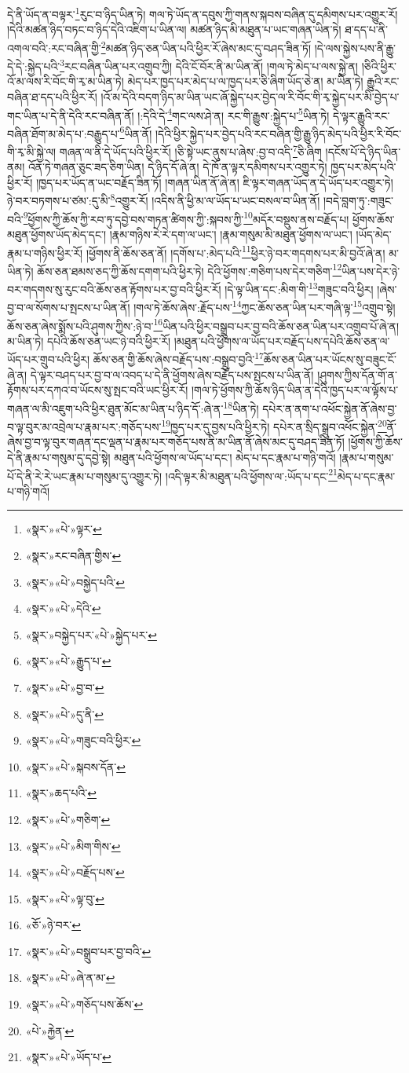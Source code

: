 དེ་ནི་ཡོད་ན་བལྟར་\footnote{«སྣར་»«པེ་»ལྟར་}རུང་བ་ཉིད་ཡིན་ཏེ། གལ་ཏེ་ཡོད་ན་དབུས་ཀྱི་གནས་སྐབས་བཞིན་དུ་དམིགས་པར་འགྱུར་རོ། །དེའི་མཚན་ཉིད་བཏང་བ་ཉིད་དེའི་འཇིག་པ་ཡིན་ལ། མཚན་ཉིད་མི་མཐུན་པ་ཡང་གཞན་ཡིན་ཏེ། ཐ་དད་པ་ནི་འགལ་བའི་:རང་བཞིན་གྱི་\footnote{«སྣར་»རང་བཞིན་གྱིས་}མཚན་ཉིད་ཅན་ཡིན་པའི་ཕྱིར་རོ་ཞེས་མང་དུ་བཤད་ཟིན་ཏོ། །དེ་ལས་སྐྱེས་པས་ནི་རྒྱུ་དེ་དེ་:སྐྱེད་པའི་\footnote{«སྣར་»«པེ་»བསྐྱེད་པའི་}རང་བཞིན་ཡིན་པར་འགྲུབ་ཀྱི། དེའི་ངོ་བོར་ནི་མ་ཡིན་ནོ། །གལ་ཏེ་མེད་པ་ལས་སྐྱེ་ན། །ཅིའི་ཕྱིར་འོ་མ་ལས་རི་བོང་གི་རྭ་མ་ཡིན་ཏེ། མེད་པར་ཁྱད་པར་མེད་པ་ལ་ཁྱད་པར་ཅི་ཞིག་ཡོད་ཅེ་ན། མ་ཡིན་ཏེ། རྒྱུའི་རང་བཞིན་ཐ་དད་པའི་ཕྱིར་རོ། །འོ་མ་དེའི་བདག་ཉིད་མ་ཡིན་ཡང་ཞོ་སྐྱེད་པར་བྱེད་ལ་རི་བོང་གི་རྭ་སྐྱེད་པར་མི་བྱེད་པ་གང་ཡིན་པ་དེ་ནི་དེའི་རང་བཞིན་ནོ། །:དེའི་དེ་\footnote{«སྣར་»«པེ་»དེའི་}གང་ལས་ཤེ་ན། རང་གི་རྒྱུས་:སྐྱེད་པ་\footnote{«སྣར་»བསྐྱེད་པར་«པེ་»སྐྱེད་པར་}ཡིན་ཏེ། དེ་ལྟར་རྒྱུའི་རང་བཞིན་ཐོག་མ་མེད་པ་:བརྒྱུད་པ་\footnote{«སྣར་»«པེ་»རྒྱུད་པ་}ཡིན་ནོ། །དེའི་ཕྱིར་སྐྱེད་པར་བྱེད་པའི་རང་བཞིན་གྱི་རྒྱུ་ཉིད་མེད་པའི་ཕྱིར་རི་བོང་གི་རྭ་མི་སྐྱེ་ལ། གཞན་ལ་ནི་དེ་ཡོད་པའི་ཕྱིར་རོ། །ཅི་སྟེ་ཡང་ནུས་པ་ཞེས་:བྱ་བ་འདི་\footnote{«སྣར་»«པེ་»བྱ་བ་}ཅི་ཞིག །དངོས་པོ་དེ་ཉིད་ཡིན་ནམ། འོན་ཏེ་གཞན་ཅུང་ཟད་ཅིག་ཡིན། དེ་ཉིད་དོ་ཞེ་ན། དེ་ཁོ་ན་ལྟར་དམིགས་པར་འགྱུར་ཏེ། ཁྱད་པར་མེད་པའི་ཕྱིར་རོ། །ཁྱད་པར་ཡོད་ན་ཡང་བརྗོད་ཟིན་ཏོ། །གཞན་ཡིན་ནོ་ཞེ་ན། ཇི་ལྟར་གཞན་ཡོད་ན་དེ་ཡོད་པར་འགྱུར་ཏེ། ཉེ་བར་བཏགས་པ་ཙམ་:དུ་མི་\footnote{«སྣར་»«པེ་»དུ་ནི་}འགྱུར་རོ། །འདིས་ནི་ཕྱི་མ་ལ་ཡོད་པ་ཡང་བསལ་བ་ཡིན་ནོ། །བདེ་བླག་ཏུ་:གཟུང་བའི་\footnote{«སྣར་»«པེ་»གཟུང་བའི་ཕྱིར་}ཕྱོགས་ཀྱི་ཆོས་ཀྱི་རབ་ཏུ་དབྱེ་བས་གཏན་ཚིགས་ཀྱི་:སྐབས་ཀྱི་\footnote{«སྣར་»«པེ་»སྐབས་དོན་}མདོར་བསྡུས་ནས་བརྗོད་པ། ཕྱོགས་ཆོས་མཐུན་ཕྱོགས་ཡོད་མེད་དང་། །རྣམ་གཉིས་རེ་རེ་དག་ལ་ཡང་། །རྣམ་གསུམ་མི་མཐུན་ཕྱོགས་ལ་ཡང་། །ཡོད་མེད་རྣམ་པ་གཉིས་ཕྱིར་རོ། །ཕྱོགས་ནི་ཆོས་ཅན་ནོ། །དགོས་པ་:མེད་པའི་\footnote{«སྣར་»ཆད་པའི་}ཕྱིར་ཉེ་བར་གདགས་པར་མི་བྱའོ་ཞེ་ན། མ་ཡིན་ཏེ། ཆོས་ཅན་ཐམས་ཅད་ཀྱི་ཆོས་དགག་པའི་ཕྱིར་ཏེ། དེའི་ཕྱོགས་:གཅིག་པས་དེར་གཅིག་\footnote{«སྣར་»«པེ་»གཅིག་}ཡིན་པས་དེར་ཉེ་བར་གདགས་སུ་རུང་བའི་ཆོས་ཅན་རྟོགས་པར་བྱ་བའི་ཕྱིར་རོ། །དེ་ལྟ་ཡིན་དང་:མིག་གི་\footnote{«སྣར་»«པེ་»མིག་གིས་}གཟུང་བའི་ཕྱིར། །ཞེས་བྱ་བ་ལ་སོགས་པ་སྤངས་པ་ཡིན་ནོ། །གལ་ཏེ་ཆོས་ཞེས་:རྗོད་པས་\footnote{«སྣར་»«པེ་»བརྗོད་པས་}ཀྱང་ཆོས་ཅན་ཡིན་པར་གཞི་ལྟ་\footnote{«སྣར་»«པེ་»ལྟ་བུ་}འགྲུབ་སྟེ། ཆོས་ཅན་ཞེས་སྨོས་པའི་ཤུགས་ཀྱིས་:ཉེ་བ་\footnote{«ཅོ་»ཉེ་བར་}ཡིན་པའི་ཕྱིར་བསྒྲུབ་པར་བྱ་བའི་ཆོས་ཅན་ཡིན་པར་འགྲུབ་པོ་ཞེ་ན། མ་ཡིན་ཏེ། དཔེའི་ཆོས་ཅན་ཡང་ཉེ་བའི་ཕྱིར་རོ། །མཐུན་པའི་ཕྱོགས་ལ་ཡོད་པར་བརྗོད་པས་དཔེའི་ཆོས་ཅན་ལ་ཡོད་པར་གྲུབ་པའི་ཕྱིར། ཆོས་ཅན་གྱི་ཆོས་ཞེས་བརྗོད་པས་:བསྒྲུབ་བྱའི་\footnote{«སྣར་»«པེ་»བསྒྲུབ་པར་བྱ་བའི་}ཆོས་ཅན་ཡིན་པར་ཡོངས་སུ་བཟུང་ངོ་ཞེ་ན། དེ་ལྟར་བཤད་པར་བྱ་བ་ལ་འབད་པ་དེ་ནི་ཕྱོགས་ཞེས་བརྗོད་པས་སྤངས་པ་ཡིན་ནོ། །ཤུགས་ཀྱིས་དོན་གོ་ན་རྟོགས་པར་དཀའ་བ་ཡོངས་སུ་སྤང་བའི་ཡང་ཕྱིར་རོ། །གལ་ཏེ་ཕྱོགས་ཀྱི་ཆོས་ཉིད་ཡིན་ན་དེའི་ཁྱད་པར་ལ་ལྟོས་པ་གཞན་ལ་མི་འཇུག་པའི་ཕྱིར་ཐུན་མོང་མ་ཡིན་པ་ཉིད་དོ་:ཞེ་ན་\footnote{«སྣར་»«པེ་»ཞེ་ན་མ་}ཡིན་ཏེ། དཔེར་ན་ནག་པ་འཕོང་སྐྱེན་ནོ་ཞེས་བྱ་བ་ལྟ་བུར་མ་འབྲེལ་པ་རྣམ་པར་:གཅོད་པས་\footnote{«སྣར་»«པེ་»གཅོད་པས་ཆོས་}ཁྱད་པར་དུ་བྱས་པའི་ཕྱིར་ཏེ། དཔེར་ན་སྲིད་སྒྲུབ་འཕོང་སྐྱེན་\footnote{«པེ་»རྐྱེན་}ནོ་ཞེས་བྱ་བ་ལྟ་བུར་གཞན་དང་ལྡན་པ་རྣམ་པར་གཅོད་པས་ནི་མ་ཡིན་ནོ་ཞེས་མང་དུ་བཤད་ཟིན་ཏོ། །ཕྱོགས་ཀྱི་ཆོས་དེ་ནི་རྣམ་པ་གསུམ་དུ་དབྱེ་སྟེ། མཐུན་པའི་ཕྱོགས་ལ་ཡོད་པ་དང་། མེད་པ་དང་རྣམ་པ་གཉི་གའོ། །རྣམ་པ་གསུམ་པོ་དེ་ནི་རེ་རེ་ཡང་རྣམ་པ་གསུམ་དུ་འགྱུར་ཏེ། །འདི་ལྟར་མི་མཐུན་པའི་ཕྱོགས་ལ་:ཡོད་པ་དང་\footnote{«སྣར་»«པེ་»ཡོད་པ་}མེད་པ་དང་རྣམ་པ་གཉི་གའོ། 